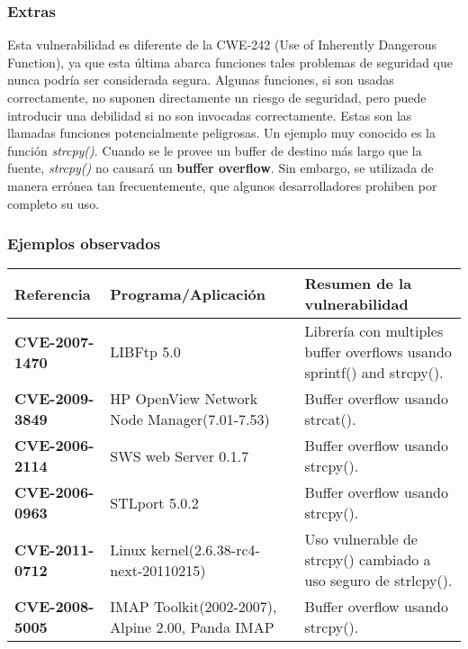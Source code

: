 \subsubsection{Extras}

Esta vulnerabilidad es diferente de la CWE-242 (Use of Inherently Dangerous Function), ya que esta última abarca funciones tales problemas de seguridad que nunca podría ser
considerada segura. Algunas funciones, si son usadas correctamente, no suponen directamente un riesgo de seguridad, pero puede introducir una debilidad si no son
invocadas correctamente. Estas son las llamadas funciones potencialmente peligrosas. Un ejemplo muy conocido es la función \textit{strcpy()}. Cuando se le provee un buffer
de destino más largo que la fuente, \textit{strcpy()} no causará un \textbf{buffer overflow}. Sin embargo, se utilizada de manera errónea tan frecuentemente, que algunos desarrolladores
prohiben por completo su uso.

\subsubsection{Ejemplos observados}

\begin{tabular}[\baselineskip]{|p{1.75cm}|p{4.75cm}|p{6.5cm}|}
  \hline
  \textbf{Referencia} & Programa/Aplicación & Resumen de la vulnerabilidad \\
  \hline
  \textbf{CVE-2007-1470} & LIBFtp 5.0 & Librería con multiples buffer overflows usando sprintf() and strcpy().\\
  \hline
  \textbf{CVE-2009-3849} & HP OpenView Network Node Manager(7.01-7.53) & Buffer overflow usando strcat(). \\
  \hline
  \textbf{CVE-2006-2114} & SWS web Server 0.1.7  & Buffer overflow usando strcpy(). \\
  \hline
  \textbf{CVE-2006-0963} & STLport 5.0.2  & Buffer overflow usando strcpy(). \\
  \hline
  \textbf{CVE-2011-0712} & Linux kernel(2.6.38-rc4-next-20110215) & Uso vulnerable de strcpy() cambiado a uso seguro de strlcpy().\\
  \hline
  \textbf{CVE-2008-5005} & IMAP Toolkit(2002-2007), Alpine 2.00, Panda IMAP & Buffer overflow usando strcpy(). \\
  \hline
\end{tabular}
